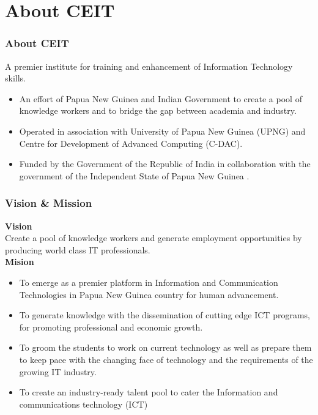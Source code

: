 \section{About CEIT}

\begin{frame}
\frametitle{About CEIT}
A premier institute for training and enhancement of Information Technology skills. \vspace{.4cm}
\begin{itemize}
    \item<1-> An effort of Papua New Guinea and Indian Government to create a pool of knowledge workers and to bridge the gap between academia and industry.
    \item<2-> Operated in association with University of Papua New Guinea (UPNG) and Centre for Development of Advanced Computing (C-DAC).
    \item<3-> Funded by the Government of the Republic of India in collaboration with the government of the Independent State of Papua New Guinea . 
\end{itemize}

\end{frame}


\begin{frame}
\frametitle{Vision \& Mission}
\textbf{Vision} \\
Create a pool of knowledge workers and generate employment opportunities by producing world class IT professionals.\\ \vspace{.4cm}
\textbf{Mision}
\begin{itemize}
    \item<1-> To emerge as a premier platform in Information and Communication Technologies in Papua New Guinea country for human advancement. 

    \item<2-> To generate knowledge with the dissemination of cutting edge ICT programs, for promoting professional and economic growth.

    \item<3-> To groom the students to work on current technology as well as prepare them to keep pace with the changing face of technology and the requirements of the growing IT industry.
    
    \item<4 -> To create an industry-ready talent pool to cater the Information and communications technology (ICT)
\end{itemize}

\end{frame}